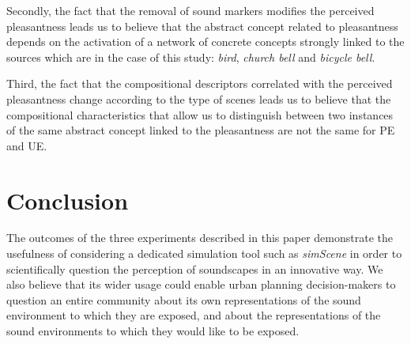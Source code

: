 \documentclass[preprint,12pt]{elsarticle}
\newcommand{\etc}{\emph{etc.}}
\begin{document}
Secondly, the fact that the removal of sound markers modifies the perceived pleasantness leads us to believe that the abstract concept related to pleasantness depends on the activation of a network of concrete concepts strongly linked to the sources which are in the case of this study: \emph{bird}, \emph{church bell} and \emph{bicycle bell}.


Third, the fact that the compositional descriptors correlated with the perceived pleasantness change according to the type of scenes leads us to believe that the compositional characteristics that allow us to distinguish between two instances of the same abstract concept linked to the pleasantness are not the same for PE and UE.

\section{Conclusion}


The outcomes of the three experiments described in this paper demonstrate the usefulness of considering a dedicated simulation tool such as \emph{simScene} in order to scientifically question the perception of soundscapes in an innovative way. We also believe that its wider usage could enable urban planning decision-makers to question an entire community about its own representations of the sound environment to which they are exposed, and about the representations of the sound environments to which they would like to be exposed.

\end{document}
